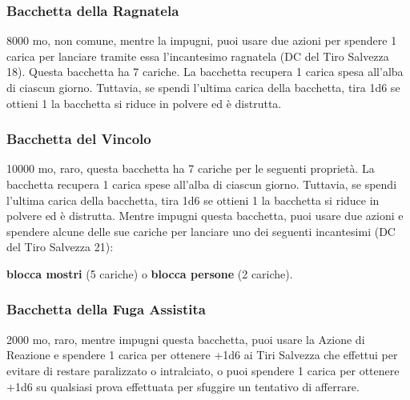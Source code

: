 \begin{multicols}{2}
\subsubsection*{Bacchetta della Ragnatela}
8000 mo, non comune, mentre la impugni, puoi usare due azioni per spendere 1 carica per lanciare tramite essa l'incantesimo ragnatela (DC del Tiro Salvezza 18). Questa bacchetta ha 7 cariche. La bacchetta recupera 1 carica spesa all'alba di ciascun giorno. Tuttavia, se spendi l'ultima carica della bacchetta, tira 1d6 se ottieni 1 la bacchetta si riduce in polvere ed è distrutta.

\subsubsection*{Bacchetta del Vincolo}
10000 mo, raro, questa bacchetta ha 7 cariche per le seguenti proprietà. La bacchetta recupera 1 carica spese all'alba di ciascun giorno. Tuttavia, se spendi l'ultima carica della bacchetta, tira 1d6 se ottieni 1 la bacchetta si riduce in polvere ed è distrutta. Mentre impugni questa bacchetta, puoi usare due azioni e spendere alcune delle sue cariche per lanciare uno dei seguenti incantesimi (DC del Tiro Salvezza 21):

\textbf{blocca mostri} (5 cariche) o \textbf{blocca persone} (2 cariche).

\subsubsection*{Bacchetta della Fuga Assistita}
2000 mo, raro, mentre impugni questa bacchetta, puoi usare la Azione di Reazione e spendere 1 carica per ottenere +1d6 ai Tiri Salvezza che effettui per evitare di restare paralizzato o intralciato, o puoi spendere 1 carica per ottenere +1d6 su qualsiasi prova effettuata per sfuggire un tentativo di afferrare.


\end{multicols}
